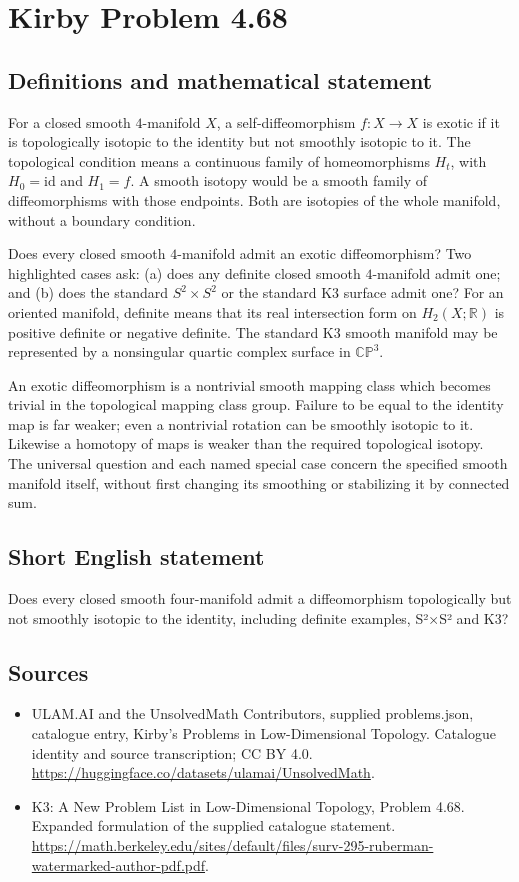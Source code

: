 \documentclass[11pt,a4paper]{article}
\begin{document}
\section*{Kirby Problem 4.68}\label{statement}

\subsection{Definitions and mathematical statement}
For a closed smooth $4$-manifold $X$, a self-diffeomorphism
$f:X\to X$ is exotic if it is topologically isotopic to the identity
but not smoothly isotopic to it. The topological condition means a
continuous family of homeomorphisms $H_t$, with $H_0=\mathrm{id}$
and $H_1=f$. A smooth isotopy would be a smooth family of
diffeomorphisms with those endpoints. Both are isotopies of the
whole manifold, without a boundary condition.

Does every closed smooth $4$-manifold admit an exotic diffeomorphism?
Two highlighted cases ask: (a) does any definite closed smooth
$4$-manifold admit one; and (b) does the standard $S^2\times S^2$
or the standard K3 surface admit one?
For an oriented manifold, definite means that its real intersection
form on $H_2(X;\mathbb R)$ is positive definite or negative definite.
The standard K3 smooth manifold may be represented by a nonsingular
quartic complex surface in $\mathbb{CP}^3$.

An exotic diffeomorphism is a nontrivial smooth mapping class which
becomes trivial in the topological mapping class group. Failure to
be equal to the identity map is far weaker; even a nontrivial
rotation can be smoothly isotopic to it. Likewise a homotopy of maps
is weaker than the required topological isotopy.
The universal question and each named special case concern the
specified smooth manifold itself, without first changing its smoothing
or stabilizing it by connected sum.
\subsection{Short English statement}
Does every closed smooth four-manifold admit a diffeomorphism topologically but not smoothly isotopic to the identity, including definite examples, S²×S² and K3?
\subsection{Sources}
\begin{itemize}
\item[S1] ULAM.AI and the UnsolvedMath Contributors, supplied problems.json, catalogue entry, Kirby's Problems in Low-Dimensional Topology. Catalogue identity and source transcription; CC BY 4.0.
\url{https://huggingface.co/datasets/ulamai/UnsolvedMath}.
\item[S2] K3: A New Problem List in Low-Dimensional Topology, Problem 4.68. Expanded formulation of the supplied catalogue statement.
\url{https://math.berkeley.edu/sites/default/files/surv-295-ruberman-watermarked-author-pdf.pdf}.
\end{itemize}
\end{document}

